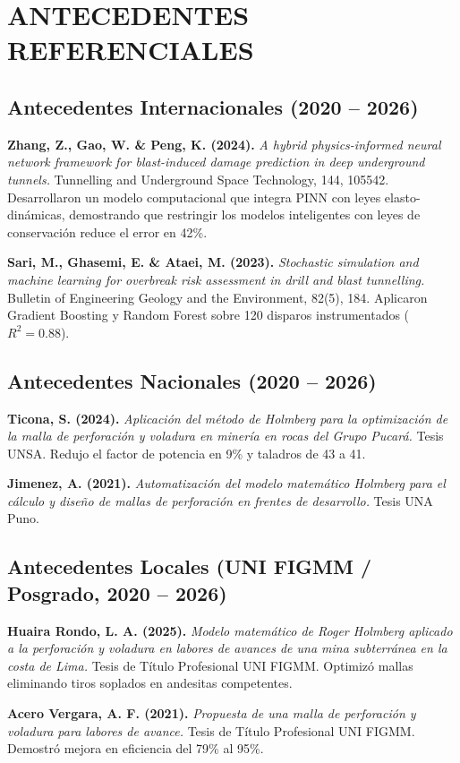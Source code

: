 \documentclass[12pt,a4paper]{article}
\begin{document}
\section{ANTECEDENTES REFERENCIALES}
\subsection{Antecedentes Internacionales (2020 -- 2026)}
\textbf{Zhang, Z., Gao, W. \& Peng, K. (2024).} \textit{A hybrid physics-informed neural network framework for blast-induced damage prediction in deep underground tunnels.} Tunnelling and Underground Space Technology, 144, 105542. Desarrollaron un modelo computacional que integra PINN con leyes elasto-dinámicas, demostrando que restringir los modelos inteligentes con leyes de conservación reduce el error en 42\%.

\textbf{Sari, M., Ghasemi, E. \& Ataei, M. (2023).} \textit{Stochastic simulation and machine learning for overbreak risk assessment in drill and blast tunnelling.} Bulletin of Engineering Geology and the Environment, 82(5), 184. Aplicaron Gradient Boosting y Random Forest sobre 120 disparos instrumentados ($R^2 = 0.88$).

\subsection{Antecedentes Nacionales (2020 -- 2026)}
\textbf{Ticona, S. (2024).} \textit{Aplicación del método de Holmberg para la optimización de la malla de perforación y voladura en minería en rocas del Grupo Pucará.} Tesis UNSA. Redujo el factor de potencia en 9\% y taladros de 43 a 41.

\textbf{Jimenez, A. (2021).} \textit{Automatización del modelo matemático Holmberg para el cálculo y diseño de mallas de perforación en frentes de desarrollo.} Tesis UNA Puno.

\subsection{Antecedentes Locales (UNI FIGMM / Posgrado, 2020 -- 2026)}
\textbf{Huaira Rondo, L. A. (2025).} \textit{Modelo matemático de Roger Holmberg aplicado a la perforación y voladura en labores de avances de una mina subterránea en la costa de Lima.} Tesis de Título Profesional UNI FIGMM. Optimizó mallas eliminando tiros soplados en andesitas competentes.

\textbf{Acero Vergara, A. F. (2021).} \textit{Propuesta de una malla de perforación y voladura para labores de avance.} Tesis de Título Profesional UNI FIGMM. Demostró mejora en eficiencia del 79\% al 95\%.
\end{document}
